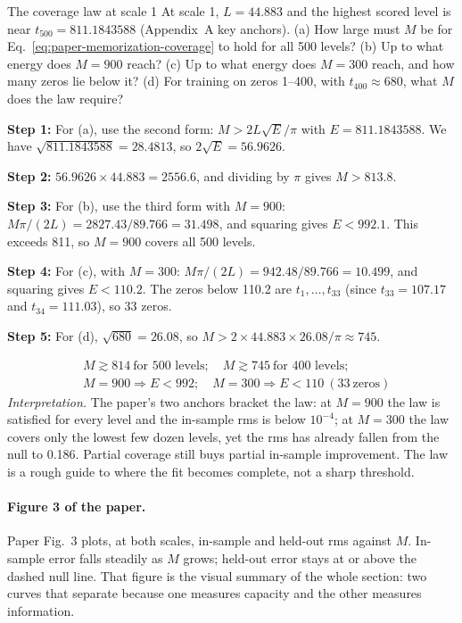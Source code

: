 \begin{sample}{The coverage law at scale 1}
At scale 1, $L=44.883$ and the highest scored level is near $t_{500}=811.1843588$ (Appendix~A key anchors). (a) How large must $M$ be for Eq.~\eqref{eq:paper-memorization-coverage} to hold for all 500 levels? (b) Up to what energy does $M=900$ reach? (c) Up to what energy does $M=300$ reach, and how many zeros lie below it? (d) For training on zeros 1--400, with $t_{400}\approx680$, what $M$ does the law require?

\textbf{Step 1:} For (a), use the second form: $M>2L\sqrt{E}/\pi$ with $E=811.1843588$. We have $\sqrt{811.1843588}=28.4813$, so $2\sqrt E=56.9626$.

\textbf{Step 2:} $56.9626\times44.883=2556.6$, and dividing by $\pi$ gives $M>813.8$.

\textbf{Step 3:} For (b), use the third form with $M=900$: $M\pi/(2L)=2827.43/89.766=31.498$, and squaring gives $E<992.1$. This exceeds 811, so $M=900$ covers all 500 levels.

\textbf{Step 4:} For (c), with $M=300$: $M\pi/(2L)=942.48/89.766=10.499$, and squaring gives $E<110.2$. The zeros below 110.2 are $t_1,\dots,t_{33}$ (since $t_{33}=107.17$ and $t_{34}=111.03$), so 33 zeros.

\textbf{Step 5:} For (d), $\sqrt{680}=26.08$, so $M>2\times44.883\times26.08/\pi\approx745$.

\[
\boxed{\begin{aligned}&M\gtrsim814\ \text{for 500 levels};\quad M\gtrsim745\ \text{for 400 levels};\\ &M=900\Rightarrow E<992;\quad M=300\Rightarrow E<110\ (33\ \text{zeros})\end{aligned}}
\]
\emph{Interpretation.} The paper's two anchors bracket the law: at $M=900$ the law is satisfied for every level and the in-sample rms is below $10^{-4}$; at $M=300$ the law covers only the lowest few dozen levels, yet the rms has already fallen from the null to 0.186. Partial coverage still buys partial in-sample improvement. The law is a rough guide to where the fit becomes complete, not a sharp threshold.
\end{sample}

\paragraph{Figure 3 of the paper.} Paper Fig.~3 plots, at both scales, in-sample and held-out rms against $M$. In-sample error falls steadily as $M$ grows; held-out error stays at or above the dashed null line. That figure is the visual summary of the whole section: two curves that separate because one measures capacity and the other measures information.

